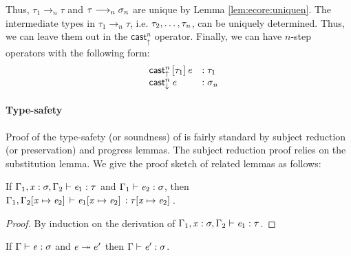 Thus, $\tau_{{\mathrm{1}}}  \longrightarrow_n  \tau$ and $\tau  \longrightarrow_n  \sigma_{\mathit{n}}$ are unique by Lemma
\ref{lem:ecore:uniquen}. The intermediate types in $\tau_{{\mathrm{1}}}  \longrightarrow_n  \tau$,
i.e. $\tau_{{\mathrm{2}}}, \dots, \tau_{\mathit{n}}$, can be uniquely determined. Thus, we can leave
them out in the $ \mathsf{cast}_{\uparrow}^n $ operator. Finally, we can have $n$-step \cast
operators with the following form:
\[\begin{array}{lll}
    &\mathsf{cast}_{\uparrow}^n \, [  \tau_{{\mathrm{1}}}  ] \,  \mathit{e} & : \tau_{{\mathrm{1}}} \\
    &\mathsf{cast}_{\downarrow}^n \, \mathit{e} & : \sigma_{\mathit{n}}
\end{array}\]

\paragraph{Type-safety}
Proof of the type-safety (or soundness) of \ecore is fairly standard by subject
reduction (or preservation) and progress lemmas. The subject reduction proof
relies on the substitution lemma. We give the proof sketch of related lemmas as
follows:

\begin{lem}[Substitution]\label{lem:ecore:subst}
	If $\Gamma_{{\mathrm{1}}}  ,  \mathit{x}  :  \sigma  ,  \Gamma_{{\mathrm{2}}}  \vdash  \mathit{e_{{\mathrm{1}}}}  :  \tau$ and $\Gamma_{{\mathrm{1}}}  \vdash  \mathit{e_{{\mathrm{2}}}}  :  \sigma$, then $\Gamma_{{\mathrm{1}}}  ,  \Gamma_{{\mathrm{2}}}  [  \mathit{x}  \mapsto  \mathit{e_{{\mathrm{2}}}}  ] \,  \vdash  \mathit{e_{{\mathrm{1}}}}  [  \mathit{x}  \mapsto  \mathit{e_{{\mathrm{2}}}}  ] \,  :  \tau  [  \mathit{x}  \mapsto  \mathit{e_{{\mathrm{2}}}}  ] \,$.
\end{lem}

\begin{proof}
    By induction on the derivation of $\Gamma_{{\mathrm{1}}}  ,  \mathit{x}  :  \sigma  ,  \Gamma_{{\mathrm{2}}}  \vdash  \mathit{e_{{\mathrm{1}}}}  :  \tau$.
\end{proof}

\begin{thm}\label{lem:ecore:reduct}
If $\Gamma  \vdash  \mathit{e}  :  \sigma$ and $\mathit{e}  \twoheadrightarrow  e'$ then $\Gamma  \vdash  \mathit{e'}  :  \sigma$.
\end{thm}

